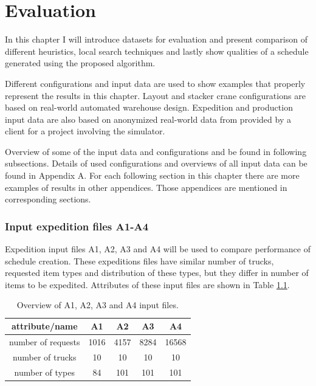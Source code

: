 \documentclass{ctuthesis}
\begin{document}
\chapter{Evaluation}
\label{ch:Evaluation}

In this chapter I will introduce datasets for evaluation and present comparison of different heuristics, local search techniques and lastly show qualities of a schedule generated using the proposed algorithm.



Different configurations and input data are used to show examples that properly represent the results in this chapter. Layout and stacker crane configurations are based on real-world automated warehouse design. Expedition and production input data are also based on anonymized real-world data from provided by a client for a project involving the simulator.

Overview of some of the input data and configurations and be found in following subsections. Details of used configurations and overviews of all input data can be found in Appendix A. For each following section in this chapter there are more examples of results in other appendices. Those appendices are mentioned in corresponding sections.


\subsection{Input expedition files A1-A4}
\label{subsec:dataA}

Expedition input files A1, A2, A3 and A4 will be used to compare performance of schedule creation. These expeditions files have similar number of trucks, requested item types and distribution of these types, but they differ in number of items to be expedited. Attributes of these input files are shown in Table \ref{tab:in1}.

\begin{table}[H]
\begin{tabular}{ |c| c c c c|} 
\hline
attribute/name & A1 & A2 & A3 & A4\\ 
\hline
number of requests & 1016 & 4157 & 8284 & 16568 \\
\hline
number of trucks & 10 & 10 & 10 & 10 \\ 
\hline
number of types & 84 & 101 & 101 & 101 \\ 
\hline
\end{tabular}
\caption{Overview of A1, A2, A3 and A4 input files.} \label{tab:in1}
\end{table}
\end{document}
